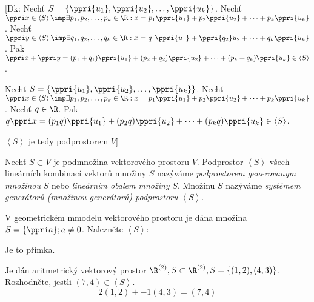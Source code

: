 [Dk: Nechť $S=\{\ppri{u_1},\ppri{u_2},\dots,\ppri{u_k}\}$.
Nechť $\ppri x \in \left< S \right> \imp \exists p_1,p_2,\dots,p_k \in \R : x=p_1\*\ppri{u_1}+p_2\*\ppri{u_2} + \cdots+ p_k\*\ppri{u_k}$.
Nechť $\ppri y \in \left< S \right> \imp \exists q_1,q_2,\dots,q_k \in \R : x=q_1\*\ppri{u_1}+\ppri{q_2}\*u_2 + \cdots+ q_k\*\ppri{u_k}$.
Pak $\ppri x + \ppri y = (p_1+q_1)\*\ppri{u_1} + (p_2+q_2)\*\ppri{u_2} + \dots+(p_k+q_k)\*\ppri{u_k} \in \left< S \right>$. 

Nechť $S=\{\ppri{u_1},\ppri{u_2},\dots,\ppri{u_k}\}$.
Nechť $\ppri x \in \left< S \right> \imp \exists p_1,p_2,\dots,p_k \in \R : x=p_1\*\ppri{u_1}+p_2\*\ppri{u_2} + \cdots+ p_k\*\ppri{u_k}$.
Nechť $q \in \R$.
Pak $q\* \ppri x = (p_1\*q)\*\ppri{u_1} + (p_2\*q)\*\ppri{u_2} + \dots+(p_k\*q)\*\ppri{u_k} \in \left< S \right>$.

$\left<S\right>$ je tedy podprostorem $V$]

\Def Nechť $S\subset V$ je podmnožina vektorového prostoru $V$.
Podprostor $\left<S\right>$ všech lineárních kombinací vektorů množiny $S$ nazýváme \emph{podprostorem generovanym množinou} $S$ nebo \emph{lineárním obalem množiny} $S$.
Množinu $S$ nazýváme \emph{systémem generátorů (množinou generátorů) podprostoru} $\left<S\right>$.

\Pr V geometrickém mmodelu vektorového prostoru je dána množina $S=\{\ppri a\}; a\neq 0$. Nalezněte $\left< S \right>$:

Je to přímka.

\Pr Je dán aritmetrický vektorový prostor $\R^{(2)}, S \subset \R^{(2)}, S = \{ (1,2) , (4,3) \}$. Rozhodněte, jestli $(7,4) \in \left<S\right>$.
$$ 2 (1,2) + -1 (4,3) = (7,4) $$




\EndDoc

